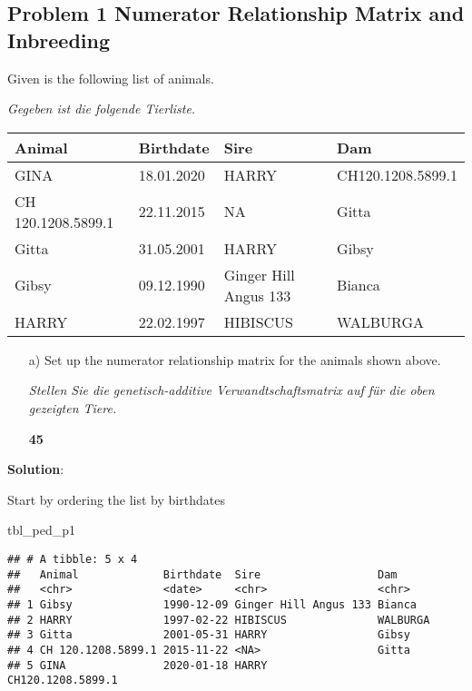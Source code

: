 \documentclass[
]{article}
\newenvironment{Shaded}{\begin{snugshade}}{\end{snugshade}}
\newcommand{\NormalTok}[1]{#1}
\newcommand{\points}[1]
{\begin{flushright}\textbf{#1}\end{flushright}}
\newcommand{\solstart}
{\vspace{3ex}\textbf{Solution}:}
\begin{document}
\clearpage
\pagebreak

\hypertarget{problem-1-numerator-relationship-matrix-and-inbreeding}{%
\subsection{Problem 1 Numerator Relationship Matrix and
Inbreeding}\label{problem-1-numerator-relationship-matrix-and-inbreeding}}

\vspace{3ex}

Given is the following list of animals.

\vspace{3ex}

\textit{Gegeben ist die folgende Tierliste.}

\begin{tabular}{llll}
\toprule
Animal & Birthdate & Sire & Dam\\
\midrule
GINA & 18.01.2020 & HARRY & CH120.1208.5899.1\\
CH 120.1208.5899.1 & 22.11.2015 & NA & Gitta\\
Gitta & 31.05.2001 & HARRY & Gibsy\\
Gibsy & 09.12.1990 & Ginger Hill Angus 133 & Bianca\\
HARRY & 22.02.1997 & HIBISCUS & WALBURGA\\
\bottomrule
\end{tabular}

\begin{enumerate}
\item[a)] Set up the numerator relationship matrix for the animals shown above.

\textit{Stellen Sie die genetisch-additive Verwandtschaftsmatrix auf für die oben gezeigten Tiere.}
\points{45}
\end{enumerate}

\solstart

Start by ordering the list by birthdates

\begin{Shaded}
\begin{Highlighting}[]
\NormalTok{tbl\_ped\_p1}
\end{Highlighting}
\end{Shaded}

\begin{verbatim}
## # A tibble: 5 x 4
##   Animal             Birthdate  Sire                  Dam              
##   <chr>              <date>     <chr>                 <chr>            
## 1 Gibsy              1990-12-09 Ginger Hill Angus 133 Bianca           
## 2 HARRY              1997-02-22 HIBISCUS              WALBURGA         
## 3 Gitta              2001-05-31 HARRY                 Gibsy            
## 4 CH 120.1208.5899.1 2015-11-22 <NA>                  Gitta            
## 5 GINA               2020-01-18 HARRY                 CH120.1208.5899.1
\end{verbatim}
\end{document}
